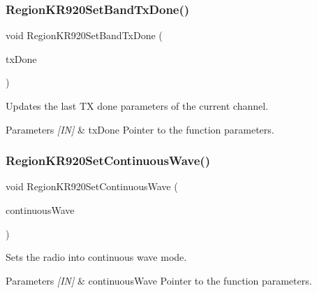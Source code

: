 \subsubsection{\texorpdfstring{Region\+K\+R920\+Set\+Band\+Tx\+Done()}{RegionKR920SetBandTxDone()}}
{\footnotesize\ttfamily void Region\+K\+R920\+Set\+Band\+Tx\+Done (\begin{DoxyParamCaption}\item[{\hyperlink{group__REGION_gad0524aa0673c0814a71e7a4f9cade3fc}{Set\+Band\+Tx\+Done\+Params\+\_\+t} $\ast$}]{tx\+Done }\end{DoxyParamCaption})}



Updates the last TX done parameters of the current channel. 


\begin{DoxyParams}{Parameters}
{\em \mbox{[}\+I\+N\mbox{]}} & tx\+Done Pointer to the function parameters. \\
\hline
\end{DoxyParams}
\mbox{\label{group__REGIONKR920_gaaa9c13bab01bbfc0445b49587c59b8e7}} 
\subsubsection{\texorpdfstring{Region\+K\+R920\+Set\+Continuous\+Wave()}{RegionKR920SetContinuousWave()}}
{\footnotesize\ttfamily void Region\+K\+R920\+Set\+Continuous\+Wave (\begin{DoxyParamCaption}\item[{\hyperlink{group__REGION_gaf39bb5ba06921139c6d17f88a8d518cd}{Continuous\+Wave\+Params\+\_\+t} $\ast$}]{continuous\+Wave }\end{DoxyParamCaption})}



Sets the radio into continuous wave mode. 


\begin{DoxyParams}{Parameters}
{\em \mbox{[}\+I\+N\mbox{]}} & continuous\+Wave Pointer to the function parameters. \\
\hline
\end{DoxyParams}
\mbox{\label{group__REGIONKR920_gaa6c50a19f3f9238b8e296d74295059e3}} 
